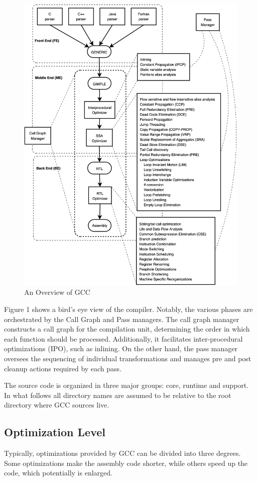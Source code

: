 \documentclass[conference]{IEEEtran}
\begin{document}
\begin{figure}[htbp]
\centering
\includegraphics [width=0.95\linewidth]{pictures/GCCoverview.png}
\caption{An Overview of GCC\cite{b1}}
\label{fig1}
\end{figure}

Figure 1 shows a bird's eye view of the compiler. Notably, the various phases are orchestrated by the Call Graph and Pass managers. The call graph manager constructs a call graph for the compilation unit, determining the order in which each function should be processed. Additionally, it facilitates inter-procedural optimizations (IPO), such as inlining. On the other hand, the pass manager oversees the sequencing of individual transformations and manages pre and post cleanup actions required by each pass.

The source code is organized in three major groups: core, runtime and support. In what follows all directory names are assumed to be relative to the root directory where GCC sources live.\cite{b1}

\subsection{Optimization Level}
Typically, optimizations provided by GCC can be divided into three degrees. Some optimizations make the assembly code shorter, while others speed up the code, which potentially is enlarged.
\end{document}
